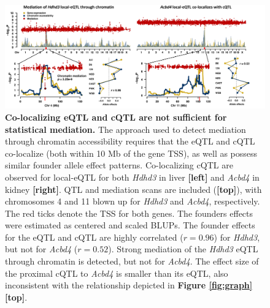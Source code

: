 \documentclass[9pt,twocolumn,twoside]{gsajnl}
\begin{document}
\begin{figure}[hp]
\renewcommand{\familydefault}{\sfdefault}\normalfont
\centering
\includegraphics[width=\textwidth]{figs/mediation_or_colocal.pdf}
\caption{\textbf{Co-localizing eQTL and cQTL are not sufficient for statistical mediation.} The approach used to detect mediation through chromatin accessibility requires that the eQTL and cQTL co-localize (both within 10 Mb of the gene TSS), as well as possess similar founder allele effect patterns. Co-localizing cQTL are observed for local-eQTL for both \textit{Hdhd3} in liver \textbf{[left]} and \textit{Acbd4} in kidney \textbf{[right]}. QTL and mediation scans are included (\textbf{[top]}), with chromosomes 4 and 11 blown up for \textit{Hdhd3} and \textit{Acbd4}, respectively. The red ticks denote the TSS for both genes. The founders effects were estimated as centered and scaled BLUPs. The founder effects for the eQTL and cQTL are highly correlated ($r = 0.96$) for \textit{Hdhd3}, but not for \textit{Acbd4} ($r = 0.52$). Strong mediation of the \textit{Hdhd3} eQTL through chromatin is detected, but not for \textit{Acbd4}. The effect size of the proximal cQTL to \textit{Acbd4} is smaller than its eQTL, also inconsistent with the relationship depicted in \textbf{Figure \ref{fig:graph}[top]}.\label{fig:colocalization}}
\end{figure}
\end{document}
